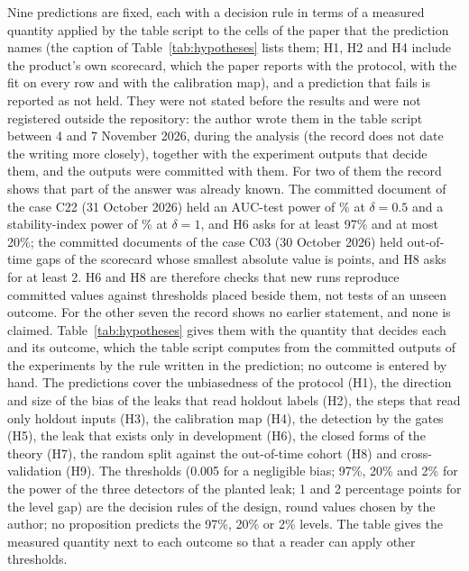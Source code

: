 Nine predictions are fixed, each with a decision rule in terms of a measured quantity applied by the table script to the cells of the paper that the prediction names (the caption of Table~\ref{tab:hypotheses} lists them; H1, H2 and H4 include the product's own scorecard, which the paper reports with the protocol, with the fit on every row and with the calibration map), and a prediction that fails is reported as not held. They were not stated before the results and were not registered outside the repository: the author wrote them in the table script between 4 and 7 November 2026, during the analysis (the record does not date the writing more closely), together with the experiment outputs that decide them, and the outputs were committed with them. For two of them the record shows that part of the answer was already known. The committed document of the case C22 (31 October 2026) held an AUC-test power of \% at $\delta=0.5$ and a stability-index power of \% at $\delta=1$, and H6 asks for at least 97\% and at most 20\%; the committed documents of the case C03 (30 October 2026) held out-of-time gaps of the scorecard whose smallest absolute value is  points, and H8 asks for at least 2. H6 and H8 are therefore checks that new runs reproduce committed values against thresholds placed beside them, not tests of an unseen outcome. For the other seven the record shows no earlier statement, and none is claimed. Table~\ref{tab:hypotheses} gives them with the quantity that decides each and its outcome, which the table script computes from the committed outputs of the experiments by the rule written in the prediction; no outcome is entered by hand. The predictions cover the unbiasedness of the protocol (H1), the direction and size of the bias of the leaks that read holdout labels (H2), the steps that read only holdout inputs (H3), the calibration map (H4), the detection by the gates (H5), the leak that exists only in development (H6), the closed forms of the theory (H7), the random split against the out-of-time cohort (H8) and cross-validation (H9). The thresholds (0.005 for a negligible bias; 97\%, 20\% and 2\% for the power of the three detectors of the planted leak; 1 and 2 percentage points for the level gap) are the decision rules of the design, round values chosen by the author; no proposition predicts the 97\%, 20\% or 2\% levels. The table gives the measured quantity next to each outcome so that a reader can apply other thresholds.



